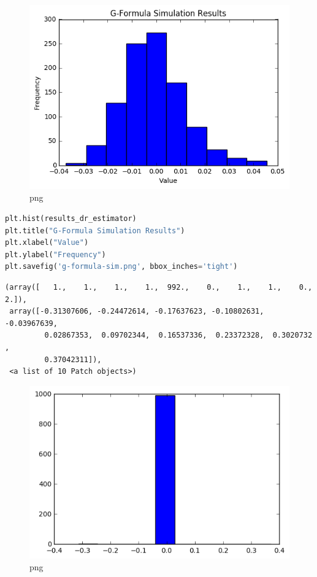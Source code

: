 \begin{figure}
\centering
\includegraphics{Final_Iteration_files/Final_Iteration_25_0.png}
\caption{png}
\end{figure}

\begin{lstlisting}[language=Python]
plt.hist(results_dr_estimator)
plt.title("G-Formula Simulation Results")
plt.xlabel("Value")
plt.ylabel("Frequency")
plt.savefig('g-formula-sim.png', bbox_inches='tight')
\end{lstlisting}

\begin{lstlisting}
(array([   1.,    1.,    1.,    1.,  992.,    0.,    1.,    1.,    0.,    2.]),
 array([-0.31307606, -0.24472614, -0.17637623, -0.10802631, -0.03967639,
         0.02867353,  0.09702344,  0.16537336,  0.23372328,  0.3020732 ,
         0.37042311]),
 <a list of 10 Patch objects>)
\end{lstlisting}

\begin{figure}
\centering
\includegraphics{Final_Iteration_files/Final_Iteration_26_1.png}
\caption{png}
\end{figure}

